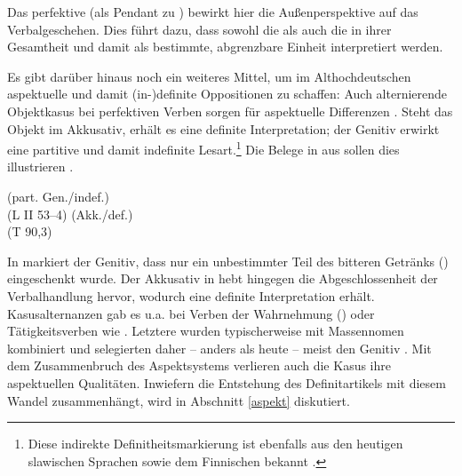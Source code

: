 \noindent
Das perfektive  (als Pendant zu ) bewirkt hier die Außenperspektive auf das Verbalgeschehen. Dies führt dazu, dass sowohl die  als auch die  in ihrer Gesamtheit und damit als bestimmte, abgrenzbare Einheit interpretiert werden. 

Es gibt darüber hinaus noch ein weiteres Mittel, um im Althochdeutschen aspektuelle und damit (in-)definite Oppositionen zu schaffen: Auch alternierende Objektkasus bei perfektiven Verben sorgen für aspektuelle Differenzen  \parencite{Donhauser1990,Leiss1994,Abraham1997,Philippi1997}. Steht das Objekt im Akkusativ, erhält es eine definite Interpretation; der Genitiv erwirkt eine partitive und damit indefinite Lesart.\footnote{Diese indirekte Definitheitsmarkierung ist ebenfalls aus den heutigen slawischen Sprachen sowie dem Finnischen bekannt \parencite[74]{Philippi1997}.} Die Belege in  aus \textcite[65]{Philippi1997} sollen dies illustrieren \parencite[vgl. auch][49]{Ferraresi2014}.

\begin{exe}
	\ex \label{ex:ahd-gen-akk}
		\begin{xlist}
		\ex \label{ex:ahd-gen}   (part. Gen./indef.) \\ 
		 (L II 53--4)
		\ex \label{ex:ahd-akk}   (Akk./def.) \\   (T 90,3)
		\end{xlist}
\end{exe}
\noindent
In  markiert der Genitiv, dass nur ein unbestimmter Teil des bitteren Getränks () eingeschenkt wurde. Der Akkusativ in  hebt hingegen die Abgeschlossenheit der Verbalhandlung hervor, wodurch  eine definite Interpretation erhält. Kasusalternanzen gab es u.a. bei Verben der Wahrnehmung () oder Tätigkeitsverben wie  \parencite[s.][100]{Donhauser1990}. Letztere wurden typischerweise mit Massennomen kombiniert und selegierten daher -- anders als heute --  meist den Genitiv \parencite[36]{Abraham1997}. Mit dem Zusammenbruch des Aspektsystems verlieren auch die Kasus ihre aspektuellen Qualitäten. Inwiefern die Entstehung des Definitartikels mit diesem Wandel zusammenhängt, wird in Abschnitt \ref{aspekt} diskutiert. 
 
